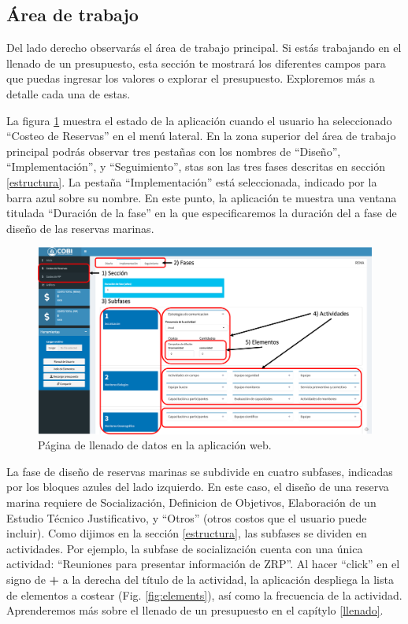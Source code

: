 \documentclass[
]{book}
\begin{document}
\hypertarget{uxe1rea-de-trabajo}{%
\subsection{Área de trabajo}\label{uxe1rea-de-trabajo}}

Del lado derecho observarás el área de trabajo principal. Si estás trabajando en el llenado de un presupuesto, esta sección te mostrará los diferentes campos para que puedas ingresar los valores o explorar el presupuesto. Exploremos más a detalle cada una de estas.

La figura \ref{fig:filling-page} muestra el estado de la aplicación cuando el usuario ha seleccionado ``Costeo de Reservas'' en el menú lateral. En la zona superior del área de trabajo principal podrás observar tres pestañas con los nombres de ``Diseño'', ``Implementación'', y ``Seguimiento'', stas son las tres fases descritas en sección \ref{estructura}. La pestaña ``Implementación'' está seleccionada, indicado por la barra azul sobre su nombre. En este punto, la aplicación te muestra una ventana titulada ``Duración de la fase'' en la que especificaremos la duración del a fase de diseño de las reservas marinas.

\begin{figure}
\includegraphics[width=61.24in]{images/jerarquia} \caption{Página de llenado de datos en la aplicación web.}\label{fig:filling-page}
\end{figure}

La fase de diseño de reservas marinas se subdivide en cuatro subfases, indicadas por los bloques azules del lado izquierdo. En este caso, el diseño de una reserva marina requiere de Socialización, Definicion de Objetivos, Elaboración de un Estudio Técnico Justificativo, y ``Otros'' (otros costos que el usuario puede incluir). Como dijimos en la sección \ref{estructura}, las subfases se dividen en actividades. Por ejemplo, la subfase de socialización cuenta con una única actividad: ``Reuniones para presentar información de ZRP''. Al hacer ``click'' en el signo de \textbf{+} a la derecha del título de la actividad, la aplicación despliega la lista de elementos a costear (Fig. \ref{fig:elements}), así como la frecuencia de la actividad. Aprenderemos más sobre el llenado de un presupuesto en el capítylo \ref{llenado}.
\end{document}
